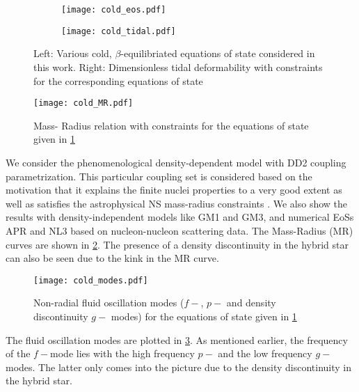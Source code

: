 \documentclass[a4paper,12pt,onehalfspacing]{report}
\begin{document}
\begin{figure}[ht]
  \centering
  \begin{subfigure}{0.5\textwidth}
    \centering
    \texttt{[image: cold\_eos.pdf]}
  \end{subfigure}%
  \begin{subfigure}{0.5\textwidth}
    \centering
    \texttt{[image: cold\_tidal.pdf]}
  \end{subfigure}
  \caption{Left: Various cold, $\beta$-equilibriated equations of state considered in this work. Right: Dimensionless tidal deformability with constraints for the corresponding equations of state}
  \label{fig: cold eos tide}
\end{figure}

\begin{figure}[ht]
    \centering
    \texttt{[image: cold\_MR.pdf]}
    \caption{Mass- Radius relation with constraints for the equations of state given in \cref{fig: cold eos tide}}
    \label{fig: cold MR}
\end{figure}

We consider the phenomenological density-dependent model with DD2 coupling parametrization. This particular coupling set is considered based on the motivation that it explains the finite nuclei properties to a very good extent as well as satisfies the astrophysical NS mass-radius constraints \cite{cromartieRelativisticShapiroDelay2019}. We also show the results with density-independent models like GM1 and GM3, and numerical EoSs APR and NL3 based on nucleon-nucleon scattering data. The Mass-Radius (MR) curves are shown in \cref{fig: cold MR}. The presence of a density discontinuity in the hybrid star can also be seen due to the kink in the MR curve. 

\begin{figure}[ht]
    \centering
    \texttt{[image: cold\_modes.pdf]}
    \caption{Non-radial fluid oscillation modes ($f-$, $p-$ and density discontinuity $g-$ modes) for the equations of state given in \cref{fig: cold eos tide}}
    \label{fig: cold modes}
\end{figure}

The fluid oscillation modes are plotted in \cref{fig: cold modes}. As mentioned earlier, the frequency of the $f-$mode lies with the high frequency $p-$ and the low frequency $g-$modes. The latter only comes into the picture due to the density discontinuity in the hybrid star. 
\end{document}
